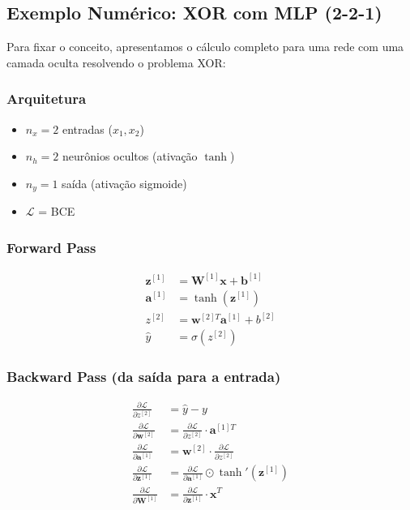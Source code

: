 \subsection{Exemplo Numérico: XOR com MLP (2-2-1)}

Para fixar o conceito, apresentamos o cálculo completo para uma rede com uma camada
oculta resolvendo o problema XOR:

\subsubsection*{Arquitetura}
\begin{itemize}
  \item $n_x = 2$ entradas ($x_1, x_2$)
  \item $n_h = 2$ neurônios ocultos (ativação $\tanh$)
  \item $n_y = 1$ saída (ativação sigmoide)
  \item $\mathcal{L}$ = BCE
\end{itemize}

\subsubsection*{Forward Pass}
\begin{align}
  \mathbf{z}^{[1]} &= \mathbf{W}^{[1]}\mathbf{x} + \mathbf{b}^{[1]} \label{eq:fwd1} \\
  \mathbf{a}^{[1]} &= \tanh(\mathbf{z}^{[1]}) \label{eq:fwd2} \\
  z^{[2]} &= \mathbf{w}^{[2]T}\mathbf{a}^{[1]} + b^{[2]} \label{eq:fwd3} \\
  \hat{y} &= \sigma(z^{[2]}) \label{eq:fwd4}
\end{align}

\subsubsection*{Backward Pass (da saída para a entrada)}
\begin{align}
  \frac{\partial \mathcal{L}}{\partial z^{[2]}} &= \hat{y} - y \label{eq:bwd1} \\
  \frac{\partial \mathcal{L}}{\partial \mathbf{w}^{[2]}} &=
    \frac{\partial \mathcal{L}}{\partial z^{[2]}} \cdot \mathbf{a}^{[1]T} \label{eq:bwd2} \\
  \frac{\partial \mathcal{L}}{\partial \mathbf{a}^{[1]}} &=
    \mathbf{w}^{[2]} \cdot \frac{\partial \mathcal{L}}{\partial z^{[2]}} \label{eq:bwd3} \\
  \frac{\partial \mathcal{L}}{\partial \mathbf{z}^{[1]}} &=
    \frac{\partial \mathcal{L}}{\partial \mathbf{a}^{[1]}} \odot \tanh'(\mathbf{z}^{[1]}) \label{eq:bwd4} \\
  \frac{\partial \mathcal{L}}{\partial \mathbf{W}^{[1]}} &=
    \frac{\partial \mathcal{L}}{\partial \mathbf{z}^{[1]}} \cdot \mathbf{x}^T \label{eq:bwd5}
\end{align}

